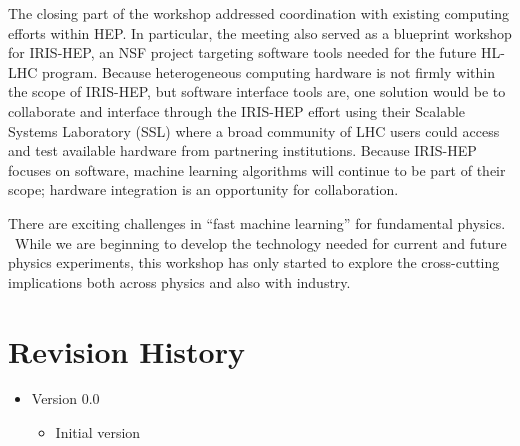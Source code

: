 \documentclass[11pt,letterpaper,fleqn]{article}
\begin{document}

The closing part of the workshop addressed coordination with existing computing efforts within HEP. In particular, the meeting also served as a blueprint workshop for IRIS-HEP, an NSF project targeting software tools needed for the future HL-LHC program. Because heterogeneous computing hardware is not firmly within the scope of IRIS-HEP, but software interface tools are, one solution would be to collaborate and interface through the IRIS-HEP effort using their Scalable Systems Laboratory (SSL) where a broad community of LHC users could access and test available hardware from partnering institutions.  Because IRIS-HEP focuses on software, machine learning algorithms will continue to be part of their scope; hardware integration is an opportunity for collaboration.

There are exciting challenges in ``fast machine learning'' for fundamental physics.  While we are beginning to develop the technology needed for current and future physics experiments, this workshop has only started to explore the cross-cutting implications both across physics and also with industry.



\appendix
\newpage
\section{Revision History}

\vspace{8pt}
\begin{itemize}
  \item Version 0.0
  \vspace{-5pt}
  \begin{itemize}
    \item Initial version
  \end{itemize}
\end{itemize}
\end{document}
